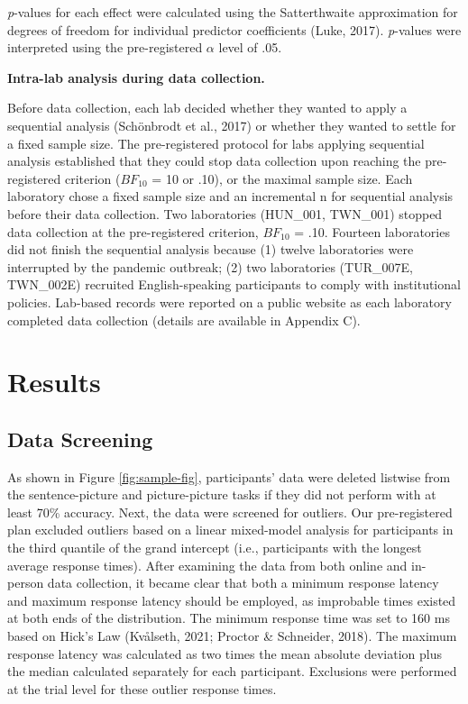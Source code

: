 \documentclass[
  man,mask,floatsintext]{apa7}
\begin{document}
\emph{p}-values for each effect were calculated using the Satterthwaite
approximation for degrees of freedom for individual predictor
coefficients (Luke, 2017). \emph{p}-values were
interpreted using the pre-registered \(\alpha\) level of .05.

\textbf{Intra-lab analysis during data collection.}

Before data collection, each lab decided whether they wanted to apply a
sequential analysis (Schönbrodt et al., 2017) or
whether they wanted to settle for a fixed sample size. The
pre-registered protocol for labs applying sequential analysis
established that they could stop data collection upon reaching the
pre-registered criterion (\(BF_{10}\) = 10 or .10), or the maximal sample
size. Each laboratory chose a fixed sample size and an incremental n for
sequential analysis before their data collection. Two laboratories
(HUN\_001, TWN\_001) stopped data collection at the pre-registered
criterion, \(BF_{10}\) = .10. Fourteen laboratories did not finish the
sequential analysis because (1) twelve laboratories were interrupted by
the pandemic outbreak; (2) two laboratories (TUR\_007E, TWN\_002E)
recruited English-speaking participants to comply with institutional
policies. Lab-based records were reported on a public website as each
laboratory completed data collection (details are available in Appendix
C).

\hypertarget{results}{%
\section{Results}\label{results}}

\hypertarget{data-screening}{%
\subsection{Data Screening}\label{data-screening}}

As shown in Figure \ref{fig:sample-fig}, participants' data were
deleted listwise from the sentence-picture and picture-picture tasks if
they did not perform with at least 70\% accuracy. Next, the data were
screened for outliers. Our pre-registered plan excluded outliers based
on a linear mixed-model analysis for participants in the third quantile
of the grand intercept (i.e., participants with the longest average
response times). After examining the data from both online and in-person
data collection, it became clear that both a minimum response latency
and maximum response latency should be employed, as improbable times
existed at both ends of the distribution. The minimum response time was
set to 160 ms based on Hick's Law (Kvålseth, 2021; Proctor \& Schneider, 2018). The maximum response latency was calculated
as two times the mean absolute deviation plus the median calculated
separately for each participant. Exclusions were performed at the trial
level for these outlier response times.
\end{document}
